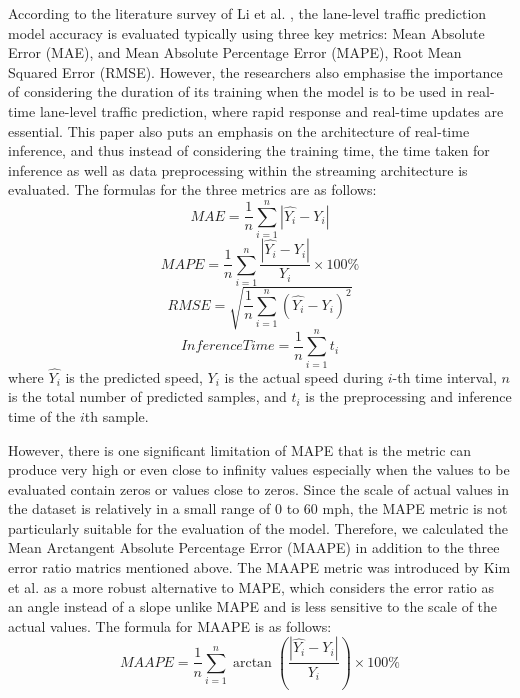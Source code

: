 \documentclass[11pt]{uonthesis}
\begin{document}
According to the literature survey of Li et al. \cite{li2024unifyinglaneleveltrafficprediction}, the lane-level traffic prediction model accuracy is evaluated typically using three key metrics: Mean Absolute Error (MAE), and Mean Absolute Percentage Error (MAPE), Root Mean Squared Error (RMSE). However, the researchers also emphasise the importance of considering the duration of its training when the model is to be used in real-time lane-level traffic prediction, where rapid response and real-time updates are essential. This paper also puts an emphasis on the architecture of real-time inference, and thus instead of considering the training time, the time taken for inference as well as data preprocessing within the streaming architecture is evaluated. The formulas for the three metrics are as follows:
\[ MAE = \frac{1}{n}\sum_{i=1}^{n}|\hat{Y_i} - Y_i| \]
\[ MAPE = \frac{1}{n}\sum_{i=1}^{n}\frac{|\hat{Y_i} - Y_i|}{Y_i} \times 100\% \]
\[ RMSE = \sqrt{\frac{1}{n}\sum_{i=1}^{n}(\hat{Y_i} - Y_i)^2} \]
\[ Inference Time = \frac{1}{n}\sum_{i=1}^{n}t_i \]
where $\hat{Y_i}$ is the predicted speed, $Y_i$ is the actual speed during $i$-th time interval, $n$ is the total number of predicted samples, and $t_i$ is the preprocessing and inference time of the $i$th sample.

However, there is one significant limitation of MAPE that is the metric can produce very high or even close to infinity values especially when the values to be evaluated contain zeros or values close to zeros. Since the scale of actual values in the dataset is relatively in a small range of 0 to 60 mph, the MAPE metric is not particularly suitable for the evaluation of the model. Therefore, we calculated the Mean Arctangent Absolute Percentage Error (MAAPE) in addition to the three error ratio matrics mentioned above. The MAAPE metric was introduced by Kim et al. \cite{KIM2016669} as a more robust alternative to MAPE, which considers the error ratio as an angle instead of a slope unlike MAPE and is less sensitive to the scale of the actual values. The formula for MAAPE is as follows:
\[ MAAPE = \frac{1}{n}\sum_{i=1}^{n} \arctan\left(\frac{|\hat{Y_i} - Y_i|}{Y_i}\right) \times 100\% \]

\end{document}
